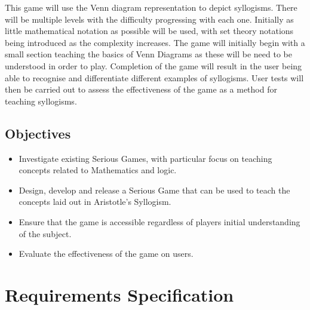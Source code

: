 \documentclass[12pt,a4paper]{report}
\begin{document}
This game will use the Venn diagram representation to depict syllogisms. 
There will be multiple levels with the difficulty progressing with each one. Initially as little mathematical notation as possible will be used, with set theory notations being introduced as the complexity increases. The game will initially begin with a small section teaching the basics of Venn Diagrams as these will be need to be understood in order to play. Completion of the game will result in the user being able to recognise and differentiate different examples of syllogisms. User tests will then be carried out to assess the effectiveness of the game as a method for teaching syllogisms.

\section{Objectives}
\begin{itemize}
  \item Investigate existing Serious Games, with particular focus on teaching concepts related to Mathematics and logic.

  \item Design, develop and release a Serious Game that can be used to teach the concepts laid out in Aristotle's Syllogism.
  
  \item Ensure that the game is accessible regardless of players initial understanding of the subject.
  \item Evaluate the effectiveness of the game on users.
  
\end{itemize}

\chapter{Requirements Specification}
\end{document}
